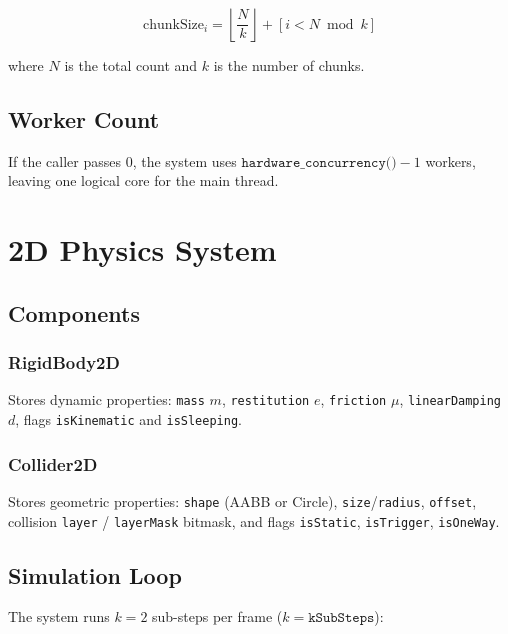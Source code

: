 \documentclass[12pt, a4paper]{report}
\theoremstyle{definition}
\theoremstyle{remark}
\begin{document}
\begin{equation}
\text{chunkSize}_i = \left\lfloor \frac{N}{k} \right\rfloor + [i < N \bmod k]
\end{equation}

where $N$ is the total count and $k$ is the number of chunks.

\section{Worker Count}

If the caller passes 0, the system uses
$\texttt{hardware\_concurrency()} - 1$ workers, leaving one logical
core for the main thread.

\chapter{2D Physics System}

\section{Components}

\subsection{RigidBody2D}

Stores dynamic properties: \texttt{mass} $m$, \texttt{restitution} $e$,
\texttt{friction} $\mu$, \texttt{linearDamping} $d$, flags
\texttt{isKinematic} and \texttt{isSleeping}.

\subsection{Collider2D}

Stores geometric properties: \texttt{shape} (AABB or Circle),
\texttt{size}/\texttt{radius}, \texttt{offset}, collision
\texttt{layer} / \texttt{layerMask} bitmask, and flags
\texttt{isStatic}, \texttt{isTrigger}, \texttt{isOneWay}.

\section{Simulation Loop}

The system runs $k = 2$ sub-steps per frame ($k = \texttt{kSubSteps}$):
\end{document}
